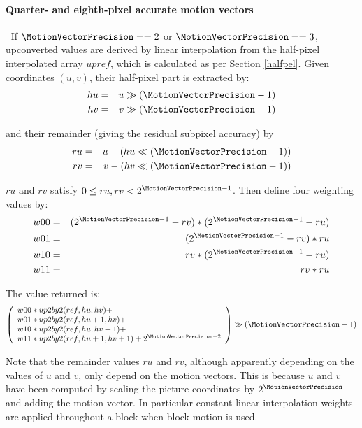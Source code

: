 \paragraph{Quarter- and eighth-pixel accurate motion vectors}
$\ $\newline
If $\MotionVectorPrecision==2$ or $\MotionVectorPrecision==3$, upconverted values are derived by linear
interpolation from the half-pixel interpolated array $upref$, which is calculated as 
per Section \ref{halfpel}. Given coordinates $(u,v)$, their half-pixel part
is extracted by:
\begin{eqnarray*}
hu & = & u \gg (\MotionVectorPrecision-1) \\
hv & = & v \gg (\MotionVectorPrecision-1) 
\end{eqnarray*}

and their remainder (giving the residual subpixel accuracy) by
\begin{eqnarray*}
ru & = & u-(hu\ll (\MotionVectorPrecision-1)) \\
rv & = & v-(hv\ll (\MotionVectorPrecision-1)) 
\end{eqnarray*}

$ru$ and $rv$ satisfy $0\leq ru,rv <2^{\MotionVectorPrecision-1}$. Then define four weighting
values by:
\begin{eqnarray*}
w00 & = & (2^{\MotionVectorPrecision-1}-rv)*(2^{\MotionVectorPrecision-1}-ru)\\
w01 & = & (2^{\MotionVectorPrecision-1}-rv)*ru\\
w10 & = & rv*(2^{\MotionVectorPrecision-1}-ru)\\
w11 & = & rv*ru
\end{eqnarray*}

The value returned is:
\[
\left(
\begin{array}{l}
w00*up2by2(ref,hu,hv)+\\
w01*up2by2(ref,hu+1,hv)+\\
w10*up2by2(ref,hu,hv+1)+\\
w11*up2by2(ref,hu+1,hv+1)+2^{\MotionVectorPrecision-2}
\end{array}
\right)\gg(\MotionVectorPrecision-1)\]

\begin{informative}
Note that the remainder values $ru$ and $rv$, although apparently depending
on the values of $u$ and $v$, only depend on the motion vectors. This is because
$u$ and $v$ have been computed by scaling the picture coordinates by
$2^{\MotionVectorPrecision}$ and adding the motion vector.
In particular
constant linear interpolation weights are applied throughout a block when
block motion is used.
\end{informative}


